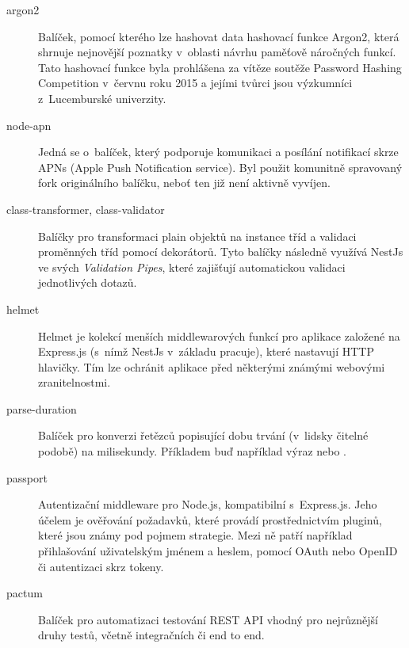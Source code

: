 \documentclass[thesis=M,czech]{FITthesis}[2019/12/23]
\begin{document}
\begin{description}
    \item[argon2] Balíček, pomocí kterého lze hashovat data hashovací funkce Argon2, která shrnuje nejnovější poznatky v~oblasti návrhu paměťově náročných funkcí. Tato hashovací funkce byla prohlášena za vítěze soutěže Password Hashing Competition \cite{password-hashing-competition} v~červnu roku 2015 a jejími tvůrci jsou výzkumníci z~Lucemburské univerzity. \cite{argon2}
    \newpage
    \item[node-apn]  Jedná se o~balíček, který podporuje komunikaci a posílání notifikací skrze APNs (Apple Push Notification service). Byl použit komunitně spravovaný fork originálního balíčku, neboť ten již není aktivně vyvíjen. \cite{node-apn}
    \item[class-transformer, class-validator] Balíčky pro transformaci plain objektů na instance tříd a validaci proměnných tříd pomocí dekorátorů. Tyto balíčky následně využívá NestJs ve svých \textit{Validation Pipes}, které zajišťují automatickou validaci jednotlivých dotazů. \cite{class-transformer, class-validator}
    \item[helmet] Helmet je kolekcí menších middlewarových funkcí pro aplikace založené na Express.js (s~nímž NestJs v~základu pracuje), které nastavují HTTP hlavičky. Tím lze ochránit aplikace před některými známými webovými zranitelnostmi. \cite{helmet}
    \item[parse-duration] Balíček pro konverzi řetězců popisující dobu trvání (v~lidsky čitelné podobě) na milisekundy. Příkladem buď například výraz  nebo . \cite{parse-duration}
    \item[passport] Autentizační middleware pro Node.js, kompatibilní s~Express.js. Jeho účelem je ověřování požadavků, které provádí prostřednictvím pluginů, které jsou známy pod pojmem strategie. Mezi ně patří například přihlašování uživatelským jménem a heslem, pomocí OAuth nebo OpenID či autentizaci skrz tokeny.
    \item[pactum] Balíček pro automatizaci testování REST API vhodný pro nejrůznější druhy testů, včetně integračních či end to end. \cite{pactum}
    \label{pactum}
\end{description}
\end{document}
